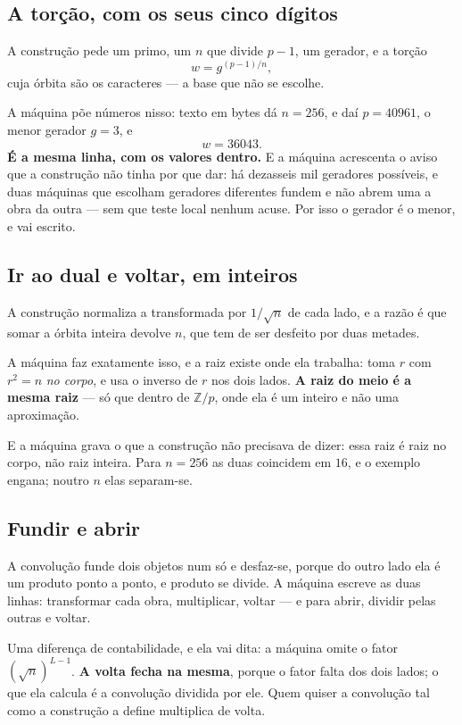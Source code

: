 \documentclass[11pt]{article}
\newcommand{\Z}{\mathbb Z}
\theoremstyle{plain}
\theoremstyle{remark}
\begin{document}
\subsection{A torção, com os seus cinco dígitos}

A construção pede um primo, um $n$ que divide $p-1$, um gerador, e a torção
\[
w=g^{(p-1)/n},
\]
cuja órbita são os caracteres --- a base que não se escolhe.

A máquina põe números nisso: texto em bytes dá $n=256$, e daí $p=40961$, o menor
gerador $g=3$, e
\[
w=36043 .
\]
\textbf{É a mesma linha, com os valores dentro.} E a máquina acrescenta o aviso
que a construção não tinha por que dar: há dezasseis mil geradores possíveis, e
duas máquinas que escolham geradores diferentes fundem e não abrem uma a obra da
outra --- sem que teste local nenhum acuse. Por isso o gerador é o menor, e vai
escrito.

\subsection{Ir ao dual e voltar, em inteiros}

A construção normaliza a transformada por $1/\sqrt n$ de cada lado, e a razão é
que somar a órbita inteira devolve $n$, que tem de ser desfeito por duas metades.

A máquina faz exatamente isso, e a raiz existe onde ela trabalha: toma $r$ com
$r^2=n$ \emph{no corpo}, e usa o inverso de $r$ nos dois lados. \textbf{A raiz do
meio é a mesma raiz} --- só que dentro de $\Z/p$, onde ela é um inteiro e não uma
aproximação.

E a máquina grava o que a construção não precisava de dizer: essa raiz é raiz no
corpo, não raiz inteira. Para $n=256$ as duas coincidem em $16$, e o exemplo
engana; noutro $n$ elas separam-se.

\subsection{Fundir e abrir}

A convolução funde dois objetos num só e desfaz-se, porque do outro lado ela é um
produto ponto a ponto, e produto se divide. A máquina escreve as duas linhas:
transformar cada obra, multiplicar, voltar --- e para abrir, dividir pelas
outras e voltar.

Uma diferença de contabilidade, e ela vai dita: a máquina omite o fator
$(\sqrt n)^{L-1}$. \textbf{A volta fecha na mesma}, porque o fator falta dos dois
lados; o que ela calcula é a convolução dividida por ele. Quem quiser a
convolução tal como a construção a define multiplica de volta.
\end{document}
